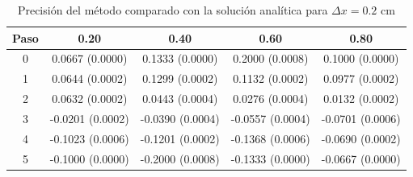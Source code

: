\documentclass[11pt]{article}
\begin{document}
\begin{table}
\center
\begin{tabular}{ c c c c c }
\hline
Paso & 0.20 & 0.40 & 0.60 & 0.80 \\
\hline
\hline
0 & 0.0667 (0.0000) & 0.1333 (0.0000) & 0.2000 (0.0008) & 0.1000 (0.0000) \\
1 & 0.0644 (0.0002) & 0.1299 (0.0002) & 0.1132 (0.0002) & 0.0977 (0.0002) \\
2 & 0.0632 (0.0002) & 0.0443 (0.0004) & 0.0276 (0.0004) & 0.0132 (0.0002) \\
3 & -0.0201 (0.0002) & -0.0390 (0.0004) & -0.0557 (0.0004) & -0.0701 (0.0006) \\
4 & -0.1023 (0.0006) & -0.1201 (0.0002) & -0.1368 (0.0006) & -0.0690 (0.0002) \\
5 & -0.1000 (0.0000) & -0.2000 (0.0008) & -0.1333 (0.0000) & -0.0667 (0.0000) \\
\end{tabular}
\caption{Precisión del método comparado con la solución analítica para $\Delta{x} = 0.2$ cm}
\label{tab:comparativa1}
\end{table}
\end{document}
